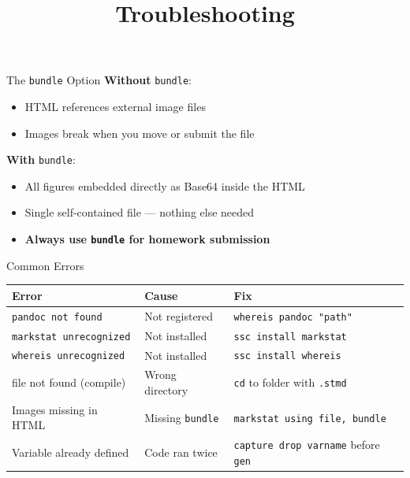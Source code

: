 \documentclass[dvipsnames,hyperref={pdfpagelabels=false}]{beamer}
\begin{document}
\begin{frame}{The \texttt{bundle} Option}
  \textbf{Without} \texttt{bundle}:
  \begin{itemize}
    \item HTML references external image files
    \item Images break when you move or submit the file
  \end{itemize}

  \vspace{0.5em}
  \textbf{With} \texttt{bundle}:
  \begin{itemize}
    \item All figures embedded directly as Base64 inside the HTML
    \item Single self-contained file --- nothing else needed
    \item \textbf{Always use \texttt{bundle} for homework submission}
  \end{itemize}
\end{frame}

\title[]{Troubleshooting}
\author{}\institute{}\date{}
\begin{frame}{}
  \titlepage
\end{frame}

\begin{frame}{Common Errors}
  \small
  \begin{center}
    \begin{tabular}{lll}
      \toprule
      \textbf{Error} & \textbf{Cause} & \textbf{Fix} \\
      \midrule
      \texttt{pandoc not found}        & Not registered      & \texttt{whereis pandoc "path"} \\
      \texttt{markstat unrecognized}   & Not installed       & \texttt{ssc install markstat} \\
      \texttt{whereis unrecognized}    & Not installed       & \texttt{ssc install whereis} \\
      file not found (compile)         & Wrong directory     & \texttt{cd} to folder with \texttt{.stmd} \\
      Images missing in HTML           & Missing \texttt{bundle} & \texttt{markstat using file, bundle} \\
      Variable already defined         & Code ran twice      & \texttt{capture drop varname} before \texttt{gen} \\
      \bottomrule
    \end{tabular}
  \end{center}
\end{frame}
\end{document}
